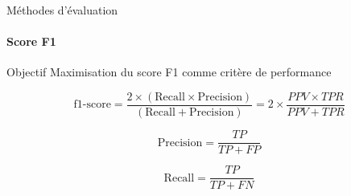 \documentclass{beamer}
\begin{document}
\begin{frame}{Méthodes d'évaluation}
\framesubtitle{Score F1}

\begin{block}{Objectif}
Maximisation du score F1 comme critère de performance
\end{block}

\begin{equation}
\text{f1-score} = \dfrac{2\times(\text{Recall} \times \text{Precision})}{(\text{Recall} + \text{Precision})} = 2\times\dfrac{PPV \times TPR}{PPV + TPR}
\end{equation}

\begin{equation}
\text{Precision} = \dfrac{TP}{TP+FP}
\end{equation}

\begin{equation}
\text{Recall} = \dfrac{TP}{TP+FN}
\end{equation}


\end{frame}
\end{document}
